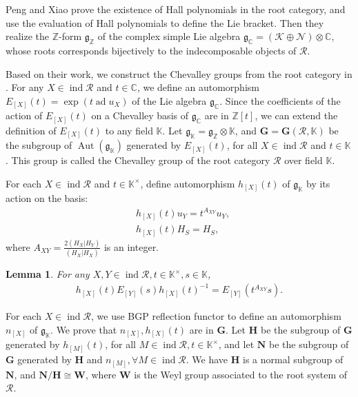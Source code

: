 \documentclass[12pt]{amsart}
\newtheorem{lemma}[theorem]{Lemma}
\begin{document}
Peng and Xiao \cite{1997ROOT} prove the existence of Hall polynomials in the root category, and use the evaluation of Hall polynomials to define the Lie bracket. 
Then they realize the $\mathbb{Z}$-form $\mathfrak{g}_{\mathbb{Z}}$ of the complex simple Lie algebra $\mathfrak{g}_{\mathbb{C}}=(\mathcal{K}\oplus \mathcal{N})\otimes \mathbb{C}$, whose roots  corresponds bijectively to the indecomposable objects of $\mathcal{R}$.

Based on their work, we construct the Chevalley groups from the root category in \cite{notes1}.
For any $X\in \operatorname{ind}\mathcal{R}$ and $t\in \mathbb{C}$, we define an automorphism $E_{[X]}(t)=\operatorname{exp}(t \operatorname{ad}u_X)$ of the Lie algebra $\mathfrak{g}_{\mathbb{C}}$.
Since the coefficients of the action of $E_{[X]}(t)$ on a Chevalley basis of $\mathfrak{g}_{\mathbb{C}}$ are in $\mathbb{Z}[t]$, we can extend the definition of $E_{[X]}(t)$ to any field $\mathbb{K}$.
Let $\mathfrak{g}_{\mathbb{K}}=\mathfrak{g}_{\mathbb{Z}}\otimes \mathbb{K}$, and $\mathbf{G}=\mathbf{G}(\mathcal{R},\mathbb{K})$ be the subgroup of $\operatorname{Aut}(\mathfrak{g}_{\mathbb{K}})$ generated by $E_{[X]}(t)$, for all $X\in \operatorname{ind}\mathcal{R}$ and $t\in \mathbb{K}$.
This group is called the Chevalley group of the root category $\mathcal{R}$ over field $\mathbb{K}$.

For each $X\in \operatorname{ind}\mathcal{R}$ and $t\in \mathbb{K}^{\times}$, define automorphism $h_{[X]}(t)$ of $\mathfrak{g}_{\mathbb{K}}$ by its action on the basis:
\begin{align*}
    &h_{[X]}(t)u_{Y} = t^{A_{XY}} u_{Y}, \\
    &h_{[X]}(t)H_{S} = H_{S},
\end{align*}
  where $A_{XY}=\frac{2(H_X|H_Y)}{(H_X|H_X)}$ is an integer.

\begin{lemma}\cite[Lemma 4.10]{notes1}\label{hEh}
    For any  $ X,Y \in \operatorname{ind}\mathcal{R},  t \in \mathbb{K}^{\times}, s \in \mathbb{K}$,
    \begin{align*}
        h_{[X]}(t) E_{[Y]}(s) h_{[X]}(t)^{-1} = E_{[Y]}(t^{A_{XY}}s).
    \end{align*}
\end{lemma}

For each $X\in \operatorname{ind}\mathcal{R}$, we use BGP reflection functor to define an automorphism $n_{[X]}$ of $\mathfrak{g}_{\mathbb{K}}$.
We prove that $n_{[X]},h_{[X]}(t)$ are in $\mathbf{G}$.
Let $\mathbf{H}$ be the subgroup of $\mathbf{G}$ generated by $h_{[M]}(t)$, for all $M \in \operatorname{ind}\mathcal{R}, t \in \mathbb{K}^{\times}$, and let $\mathbf{N}$ be the subgroup of $\mathbf{G}$ generated by $\mathbf{H}$ and $n_{[M]},\forall M \in \operatorname{ind}\mathcal{R}$.
We have $\mathbf{H}$ is a normal subgroup of $\mathbf{N}$, and $\mathbf{N}/\mathbf{H}\cong \mathbf{W}$, where $\mathbf{W}$ is the Weyl group associated to the root system of $\mathcal{R}$. 
\end{document}
